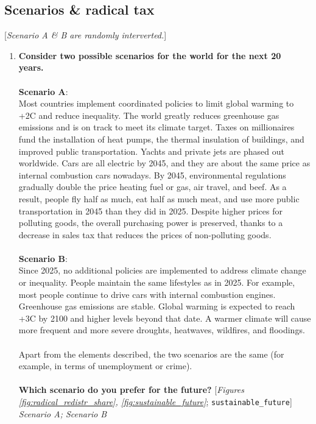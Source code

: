  \subsection*{Scenarios \& radical tax} 
 [\textit{Scenario A \& B are randomly interverted.}]
 \begin{enumerate}[resume] 
\item  \label{q:sustainable_future} \textbf{Consider two possible scenarios for the world for the next 20 years.~\\\\Scenario A}: \\Most countries implement coordinated policies to limit global warming to +2\textdegree{}C and reduce inequality. The world greatly reduces greenhouse gas emissions and is on track to meet its climate target. Taxes on millionaires fund the installation of heat pumps, the thermal insulation of buildings, and improved public transportation. Yachts and private jets are phased out worldwide. Cars are all electric by 2045, and they are about the same price as internal combustion cars nowadays. By 2045, environmental regulations gradually double the price heating fuel or gas, air travel, and beef. As a result, people fly half as much, eat half as much meat, and use more public transportation in 2045 than they did in 2025. Despite higher prices for polluting goods, the overall purchasing power is preserved, thanks to a decrease in sales tax that reduces the prices of non-polluting goods.\\\\\textbf{Scenario B}:\\Since 2025, no additional policies are implemented to address climate change or inequality. People maintain the same lifestyles as in 2025. For example, most people continue to drive cars with internal combustion engines. Greenhouse gas emissions are stable. Global warming is expected to reach +3\textdegree{}C by 2100 and higher levels beyond that date. A warmer climate will cause more frequent and more severe droughts, heatwaves, wildfires, and floodings.\\\\Apart from the elements described, the two scenarios are the same (for example, in terms of unemployment or crime). \\\\\textbf{Which scenario do you prefer for the future?} [\textit{Figures \ref{fig:radical_redistr_share}, \ref{fig:sustainable_future}}; 
\verb|sustainable_future|]
  \\ \textit{Scenario A; Scenario B} \\\\

\end{enumerate}
